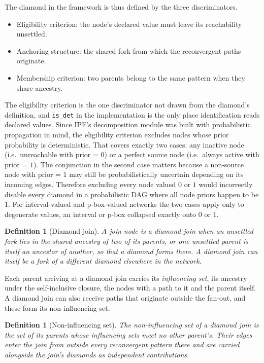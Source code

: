 \documentclass[12pt]{report}
\newtheorem{definition}[theorem]{Definition}
\begin{document}
The diamond in the framework is thus defined by the three discriminators.
\begin{itemize}
\item Eligibility criterion: the node's declared value must leave its reachability unsettled.
\item Anchoring structure: the shared fork from which the reconvergent paths originate.
\item Membership criterion: two parents belong to the same pattern when they share ancestry.
\end{itemize}

\label{sec:dd-isdet}
The eligibility criterion is the one discriminator not drawn from the diamond's definition, and \texttt{is\_det} in the implementation is the only place identification reads declared values. Since IPF's decomposition module was built with probabilistic propagation in mind, the eligibility criterion excludes nodes whose prior probability is deterministic. That covers exactly two cases: any inactive node (i.e.\ unreachable with prior = $0$) or a perfect source node (i.e.\ always active with prior = $1$). The conjunction in the second case matters because a non-source node with prior = $1$ may still be probabilistically uncertain depending on its incoming edges. Therefore excluding every node valued $0$ or $1$ would incorrectly disable every diamond in a probabilistic DAG where all node priors happen to be $1$. For interval-valued and p-box-valued networks the two cases apply only to degenerate values, an interval or p-box collapsed exactly onto $0$ or $1$.

\begin{definition}[Diamond join]
\label{def:djoin}
A join node is a \emph{diamond join} when an unsettled fork lies in the shared ancestry of two of its parents, or one unsettled parent is itself an ancestor of another, so that a diamond forms there. A diamond join can itself be a fork of a different diamond elsewhere in the network.
\end{definition}

Each parent arriving at a diamond join carries its \emph{influencing set}, its ancestry under the self-inclusive closure, the nodes with a path to it and the parent itself. A diamond join can also receive paths that originate outside the fan-out, and these form its non-influencing set.

\begin{definition}[Non-influencing set]
\label{def:nondi}
The \emph{non-influencing set} of a diamond join is the set of its parents whose influencing sets meet no other parent's. Their edges enter the join from outside every reconvergent pattern there and are carried alongside the join's diamonds as independent contributions.
\end{definition}
\end{document}
